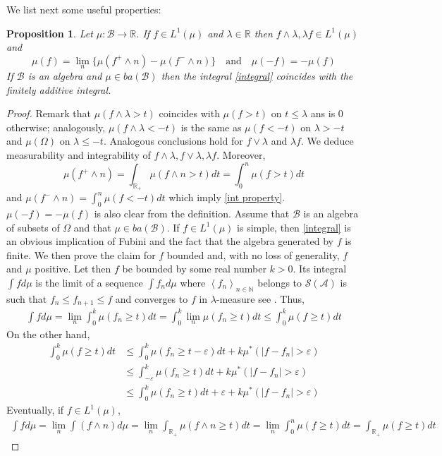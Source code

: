 \documentclass[11pt]{amsart}
\theoremstyle{plain}
\newtheorem{proposition}{Proposition}
\begin{document}
We list next some useful properties:

\begin{proposition}
\label{pro integral}
Let $\mu:\mathscr B\to{\mathbb{R}}$. If $f\in L^1(\mu)$ and $\lambda\in{\mathbb{R}}$ then 
$f\wedge\lambda,\lambda f\in L^1(\mu)$ and 
\begin{equation}
\label{int property}
\mu(f)
=
\lim_n\{\mu(f^+\wedge n)-\mu(f^-\wedge n)\}
\quad\text{and}\quad
\mu(-f)=-\mu(f)
\end{equation}
If $\mathscr B$ is an algebra and $\mu\in ba(\mathscr B)$ then the integral 
\eqref{integral} coincides with the finitely additive integral.
\end{proposition}

\begin{proof}
Remark that $\mu(f\wedge\lambda>t)$ coincides with $\mu(f>t)$ on $t\le\lambda$
ans is $0$ otherwise; analogously, $\mu(f\wedge\lambda<-t)$ is the same as
$\mu(f<-t)$ on $\lambda>-t$ and $\mu(\Omega)$ on $\lambda\le-t$. Analogous
conclusions hold for $f\vee\lambda$ and $\lambda f$. We deduce measurability
and integrability of $f\wedge\lambda,f\vee\lambda,\lambda f$. Moreover,
\begin{equation*}
\mu(f^+\wedge n)=\int_{{\mathbb{R}}_+}\mu(f\wedge n>t)dt=\int_0^n\mu(f>t)dt
\end{equation*}
and $\mu(f^-\wedge n)=\int_0^n\mu(f<-t)dt$ which imply \eqref{int property}.
$\mu(-f)=-\mu(f)$ is also clear from the definition. Assume that $\mathscr B$
is an algebra of subsets of $\Omega$ and that $\mu\in ba(\mathscr B)$. If
$f\in L^1(\mu)$ is simple, then \eqref{integral} is an obvious implication of Fubini
and the fact that the algebra generated by $f$ is finite. We then prove the claim
for $f$ bounded and, with no loss of generality, $f$ and $\mu$ positive. Let then 
$f$ be bounded by some real number $k>0$. Its integral $\int fd\mu$ is the 
limit of a sequence $\int f_nd\mu$ where ${{{\left\langle {{f}}_{{{n}}}\right\rangle_{{{n}}\in {\mathbb{N}}} }}}$ belongs to ${\mathscr{S}}({\mathscr{A}})$ is 
such that $f_n\le f_{n+1}\le f$ and converges to $f$ in $\lambda$-measure see 
\cite[4.5.7]{rao}. Thus,
\begin{align*}
\int fd\mu=\lim_n\int_0^k\mu(f_n\ge t)dt=\int_0^k\lim_n\mu(f_n\ge t)dt
\le\int_0^k\mu(f\ge t)dt
\end{align*}
On the other hand, 
\begin{align*}
\int_0^k\mu(f\ge t)dt
&\le
\int_0^k\mu(f_n\ge t-\varepsilon)dt+k\mu^*({\vert {f-f_n}\vert}>\varepsilon)\\
&\le
\int_{-\varepsilon}^k\mu(f_n\ge t)dt+k\mu^*({\vert {f-f_n}\vert}>\varepsilon)\\
&\le
\int_0^k\mu(f_n\ge t)dt+\varepsilon+k\mu^*({\vert {f-f_n}\vert}>\varepsilon)
\end{align*}
Eventually, if $f\in L^1(\mu)$,
\begin{align*}
\int fd\mu
=
\lim_n\int (f\wedge n)d\mu=\lim_n\int_{{\mathbb{R}}_+}\mu(f\wedge n\ge t)dt
=
\lim_n\int_0^n\mu(f\ge t)dt=\int_{{\mathbb{R}}_+}\mu(f\ge t)dt
\end{align*}
\end{proof}
\end{document}
